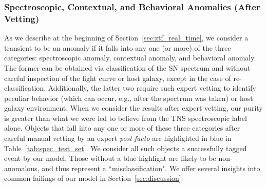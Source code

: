 \documentclass[twocolumn]{aastex63}
\begin{document}
\subsubsection{Spectroscopic, Contextual, and Behavioral Anomalies (After Vetting)} \label{subsubsec:spec_cont_beh_anom}

As we describe at the beginning of Section~\ref{sec:ztf_real_time}, we consider a transient to be an anomaly if it falls into any one (or more) of the three categories: spectroscopic anomaly, contextual anomaly, and behavioral anomaly. The former can be obtained via classification of the SN spectrum and without careful inspection of the light curve or host galaxy, except in the case of re-classification. Additionally, the latter two require such expert vetting to identify peculiar behavior (which can occur, e.g., after the spectrum was taken) or host galaxy environment. When we consider the results after expert vetting, our purity is greater than what we were led to believe from the TNS spectroscopic label alone. Objects that fall into any one or more of these three categories after careful manual vetting by an expert \textit{post facto} are highlighted in blue in Table~\ref{tab:spec_test_set}. We consider all such objects a successfully tagged event by our model. Those without a blue highlight are likely to be non-anomalous, and thus represent a ``misclassification". We offer several insights into common failings of our model in Section~\ref{sec:discussion}. \par
\end{document}
